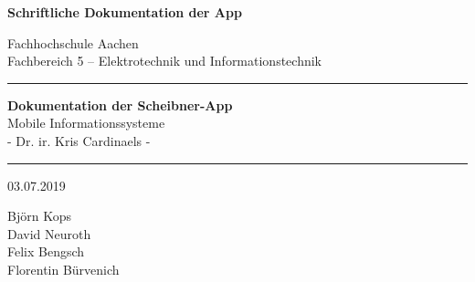 \documentclass[
	a4paper,
	12pt,
	ngerman
]{scrreprt}
\begin{document}
	\begin{titlepage}
		\parindent0pt
	
	
		\centering
	
		\textbf{
			\large {
				Schriftliche Dokumentation der App
			}
		}
	
		\vspace{1.5cm}
	
		\large{
			Fachhochschule Aachen\\
			Fachbereich 5 -- Elektrotechnik und Informationstechnik 	
		}
	
		\vspace{1cm}
		
		
		\vspace{2cm}
	
		\rule{\textwidth}{1pt}
	
		\vspace{1cm}
	
		\textbf{
			\Huge{
				Dokumentation der Scheibner-App
			}\\[3mm]					
		}	
		\large{
			Mobile Informationssysteme \\			
			- Dr. ir. Kris Cardinaels	- 		
		}

	
		\vspace{1cm}
	
		\rule{\textwidth}{1pt}
	
		\vspace{5cm}
	
		03.07.2019
	
		\vspace{1cm}
	
		
		Björn Kops\\[1mm]
		David Neuroth\\[1mm]
		Felix Bengsch\\[1mm]
		Florentin Bürvenich
		
		
		\thispagestyle{empty}
	\end{titlepage}
\end{document}
